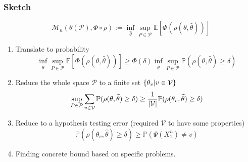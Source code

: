 \documentclass[10pt,xcolor={usenames,dvipsnames,table},aspectratio=169]{beamer}
\begin{document}
\begin{frame}
\frametitle{Sketch}   

    \[
    \mathcal{M}_n(\theta(\mathcal{P}), \Phi \circ \rho) := \inf_{\widehat{\theta}} \sup_{P \in \mathcal{P}} \mathbb{E} \left[  \Phi(\rho(\theta, \widehat{\theta})) \right]
    \] 
    \begin{enumerate}
        \item Translate to probability
            \[
            \inf_{\widehat{\theta}} \sup_{P \in \mathcal{P}} \mathbb{E} \left[  \Phi(\rho(\theta, \widehat{\theta})) \right]
            \geq \Phi(\delta) \inf_{\widehat{\theta}} \sup_{P \in \mathcal{P}} \mathbb{P}(\rho(\theta, \widehat{\theta}) \geq \delta)
            \] 
        \item Reduce the whole space $ \mathcal{P}$ to a finite set $\left\{\theta_v| v \in \mathcal{V}\right\}$
            \[
            \sup_{P \in \mathcal{P}} \sum_{v \in \mathcal{V}} \mathbb{P}(\rho(\theta, \widehat{\theta}) \geq \delta) \geq \dfrac{1}{\left\lvert\mathcal{V}\right\rvert} \mathbb{P}(\rho(\theta_v, \widehat{\theta}) \geq \delta)
            \] 
        \item Reduce to a hypothesis testing error (required $\mathcal{V}$ to have some properties)
            \[
            \mathbb{P}(\rho(\theta_v, \widehat{\theta}) \geq \delta) \geq \mathbb{P}(\Psi(X_1^{n}) \neq v)
            \] 
        \item Finding concrete bound based on specific problems.

    \end{enumerate}
\end{frame}
\end{document}
